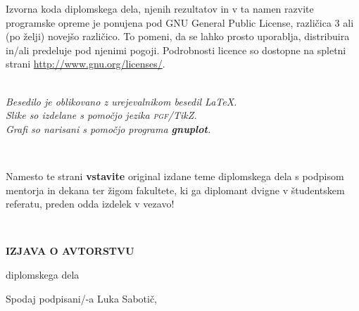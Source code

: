 \documentclass[12pt,a4paper,openany]{book}
\newcommand{\gnuplot}{\textbf{gnuplot}}
\newcommand{\pgfname}{\textsc{pgf}}
\newcommand{\tikzname}{Ti\emph{k}Z}
\begin{document}
\vspace*{1.5cm}
{\small \noindent
Izvorna koda diplomskega dela, njenih rezultatov in v ta namen razvite programske opreme je ponujena pod GNU General Public License,
različica 3 ali (po želji) novejšo različico. To pomeni, da se lahko prosto uporablja, distribuira in/ali predeluje pod njenimi pogoji.
Podrobnosti licence so dostopne na spletni strani \url{http://www.gnu.org/licenses/}.
}

\begin{center} 
\ \\ \vfill
{\em
Besedilo je oblikovano z urejevalnikom besedil \LaTeX. \\ Slike so izdelane s pomočjo jezika \pgfname/\tikzname. \\ Grafi so narisani
s pomočjo programa \gnuplot.}
\end{center}

\newpage

\ \thispagestyle{empty}

\newpage


\thispagestyle{empty}

Namesto te strani {\bf vstavite} original izdane teme diplomskega dela s podpisom mentorja in dekana ter \v zigom fakultete, ki ga diplomant
dvigne v študent\-skem referatu,  preden odda izdelek v vezavo!

\newpage


\ \thispagestyle{empty}

\newpage



\thispagestyle{empty}

\vspace{1cm}
\begin{center} 
{\Large \textbf{IZJAVA O AVTORSTVU}}
\end{center}

\begin{center} 
{\Large diplomskega dela}
\end{center}

\vspace{1cm}
Spodaj podpisani/-a \hspace{0.5cm} Luka Sabotič,
\end{document}
